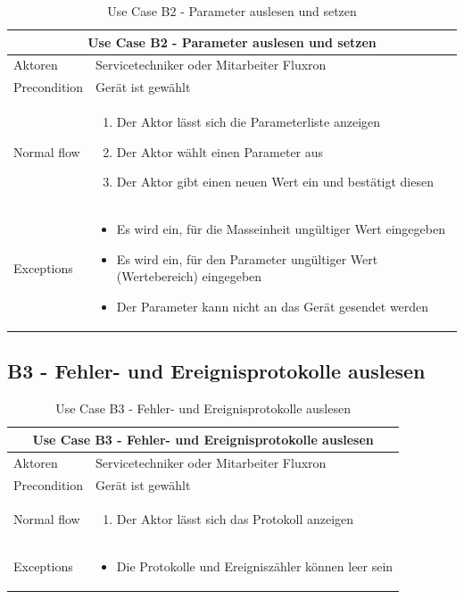 \begin{table}[H]
\begin{tabular}{|p{3cm}|p{10cm}|}
  \hline
  \multicolumn{2}{|c|}{Use Case B2 - Parameter auslesen und setzen}
  \\\hline
  	Aktoren
  &
	Servicetechniker oder Mitarbeiter Fluxron
  \\\hline
  	Precondition
  &
    Gerät ist gewählt
  \\\hline
  	Normal flow
  &
	\begin{enumerate}
	  \item Der Aktor lässt sich die Parameterliste anzeigen
	  \item Der Aktor wählt einen Parameter aus
      \item Der Aktor gibt einen neuen Wert ein und bestätigt diesen
	\end{enumerate}
  \\\hline
    	Exceptions
  &
	\begin{itemize}
      \item Es wird ein, für die Masseinheit ungültiger Wert eingegeben
      \item Es wird ein, für den Parameter ungültiger Wert (Wertebereich) eingegeben
      \item Der Parameter kann nicht an das Gerät gesendet werden
	\end{itemize}
  \\\hline
\end{tabular}
\caption{Use Case B2 - Parameter auslesen und setzen}
\end{table}

\subsection{B3 - Fehler- und Ereignisprotokolle auslesen}
\label{subsec:B3 - Fehler- und Ereignisprotokolle auslesen}

\begin{table}[H]
\begin{tabular}{|p{3cm}|p{10cm}|}
  \hline
  \multicolumn{2}{|c|}{Use Case B3 - Fehler- und Ereignisprotokolle auslesen}
  \\\hline
  	Aktoren
  &
	Servicetechniker oder Mitarbeiter Fluxron
  \\\hline
  	Precondition
  &
    Gerät ist gewählt
  \\\hline
  	Normal flow
  &
	\begin{enumerate}
	  \item Der Aktor lässt sich das Protokoll anzeigen
	\end{enumerate}
  \\\hline
    	Exceptions
  &
	\begin{itemize}
      \item Die Protokolle und Ereigniszähler können leer sein
	\end{itemize}
  \\\hline
\end{tabular}
\caption{Use Case B3 - Fehler- und Ereignisprotokolle auslesen}
\end{table}